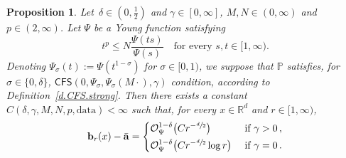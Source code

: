 \documentclass[11pt]{article} %
\numberwithin{equation}{section}
\newtheorem{proposition}[theorem]{Proposition}
\theoremstyle{definition}
\let\originalleft\left
\let\originalright\right
\renewcommand{\left}{\mathopen{}\mathclose\bgroup\originalleft}
\renewcommand{\right}{\aftergroup\egroup\originalright}
\newcommand*{\R}{\ensuremath{\mathbb{R}}}
\renewcommand{\b}{\ensuremath{\mathbf{b}}}
\renewcommand{\a}{\mathbf{a}}
\newcommand{\ahom}{\bar{\a}}
\renewcommand{\P}{\mathbb{P}}
\renewcommand{\O}{\mathcal{O}}
\newcommand{\data}{\mathrm{data}}
\newcommand{\CFS}{\mathsf{CFS}}
\begin{document}
\begin{proposition} 
\label{p.psipsi.coarse.optimal}
Let~$\delta \in (0,\frac12)$ and $\gamma \in [0,\infty]$, $M,N \in (0,\infty)$ and $p \in (2,\infty)$. Let $\Psi$ be a Young function satisfying 
\begin{equation}  \label{e.Psi.pgrowth.again}
t^p \leq N \frac{\Psi(t s)}{\Psi(s)}  \quad \mbox{for every $s, t \in [1,\infty)$}. 
\end{equation} 
Denoting $\Psi_\sigma(t) := \Psi(t^{1-\sigma})$ for $\sigma \in [0,1)$, we suppose that $\P$ satisfies, for $\sigma \in \{0,\delta\}$,  $\CFS(0,\Psi_\sigma,\Psi_\sigma(M\cdot),\gamma)$ condition,  according to Definition~\ref{d.CFS.strong}. Then there exists a constant $C(\delta,\gamma,M,N,p,\data) < \infty$ such that, for every $x\in \R^d$ and $r \in [1,\infty)$,
\begin{equation} 
\label{e.betazero}
\b_{r}(x)  - \ahom  
=  
\left\{
\begin{aligned}
& \O_{\Psi}^{1-\delta} \bigl(C r^{-\sfrac d2}\bigr) & & \mbox{ if } \gamma>0
\, ,  
\\
& 
 \O_{\Psi}^{1-\delta} \bigl(C r^{-\sfrac d2} \log r \bigr) & & \mbox{ if } \gamma = 0
\, .
\end{aligned}
\right.
\end{equation}
\end{proposition}
\end{document}
